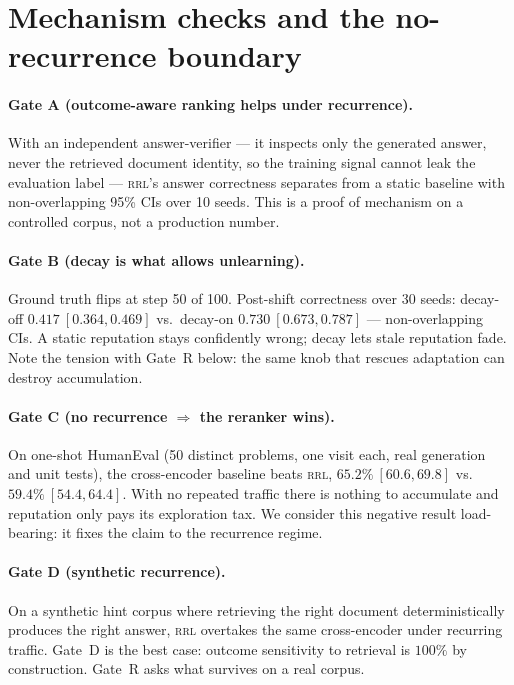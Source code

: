 \documentclass[11pt]{article}
\newcommand{\rrl}{\textsc{rrl}}
\begin{document}
\section{Mechanism checks and the no-recurrence boundary}
\label{sec:gates}

\paragraph{Gate A (outcome-aware ranking helps under recurrence).} With an
independent answer-verifier --- it inspects only the generated answer, never
the retrieved document identity, so the training signal cannot leak the
evaluation label --- \rrl{}'s answer correctness separates from a static
baseline with non-overlapping 95\% CIs over 10 seeds. This is a proof of
mechanism on a controlled corpus, not a production number.

\paragraph{Gate B (decay is what allows unlearning).} Ground truth flips at
step 50 of 100. Post-shift correctness over 30 seeds: decay-off
$0.417\ [0.364, 0.469]$ vs.\ decay-on $0.730\ [0.673, 0.787]$ ---
non-overlapping CIs. A static reputation stays confidently wrong; decay lets
stale reputation fade. Note the tension with Gate~R below: the same knob that
rescues adaptation can destroy accumulation.

\paragraph{Gate C (no recurrence $\Rightarrow$ the reranker wins).} On
one-shot HumanEval \citep{chen2021humaneval} (50 distinct problems, one visit
each, real generation and unit tests), the cross-encoder baseline beats
\rrl{}, $65.2\%\ [60.6, 69.8]$ vs.\ $59.4\%\ [54.4, 64.4]$. With no repeated
traffic there is nothing to accumulate and reputation only pays its
exploration tax. We consider this negative result load-bearing: it fixes the
claim to the recurrence regime.

\paragraph{Gate D (synthetic recurrence).} On a synthetic hint corpus where
retrieving the right document deterministically produces the right answer,
\rrl{} overtakes the same cross-encoder under recurring traffic. Gate~D is
the best case: outcome sensitivity to retrieval is $100\%$ by construction.
Gate~R asks what survives on a real corpus.
\end{document}
